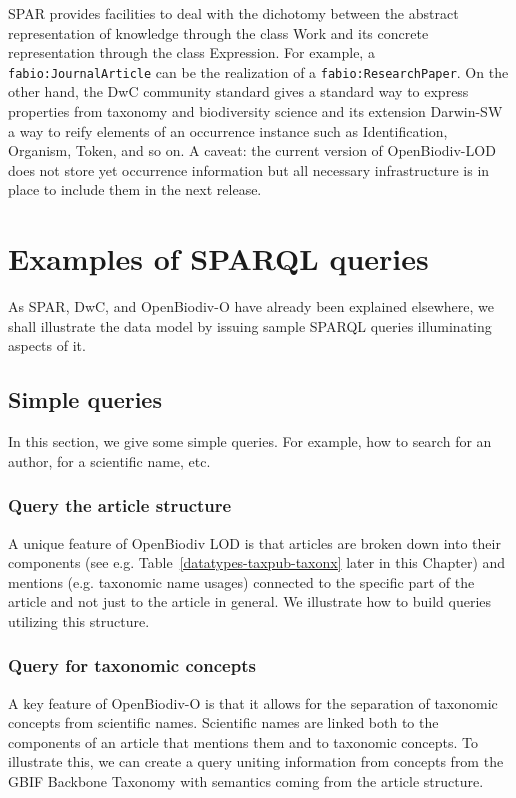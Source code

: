 SPAR provides facilities to deal with the dichotomy between the abstract representation of knowledge through the class Work and its concrete representation through the class Expression. For example, a {\tt fabio:JournalArticle} can be the realization of a {\tt fabio:ResearchPaper}. On the other hand, the DwC community standard gives a standard way to express properties from taxonomy and biodiversity science and its extension Darwin-SW a way to reify elements of an occurrence instance such as Identification, Organism, Token, and so on. A caveat: the current version of OpenBiodiv-LOD does not store yet occurrence information but all necessary infrastructure is in place to include them in the next release.

\section{Examples of SPARQL queries}

As SPAR, DwC, and OpenBiodiv-O have already been explained elsewhere, we shall illustrate the data model by issuing sample SPARQL queries illuminating aspects of it.

\subsection{Simple queries}

In this section, we give some simple queries. For example, how to search for an author, for a scientific name, etc.

\subsubsection{Query the article structure} 

A unique feature of OpenBiodiv LOD is that articles are broken down into their components (see e.g. Table~\ref{datatypes-taxpub-taxonx} later in this Chapter) and mentions (e.g. taxonomic name usages) connected to the specific part of the article and not just to the article in general. We illustrate how to build queries utilizing this structure.

\subsubsection{Query for taxonomic concepts}

A key feature of OpenBiodiv-O is that it allows for the separation of taxonomic concepts from scientific names. Scientific names are linked both to the components of an article that mentions them and to taxonomic concepts. To illustrate this, we can create a query uniting information from concepts from the GBIF Backbone Taxonomy with semantics coming from the article structure.

